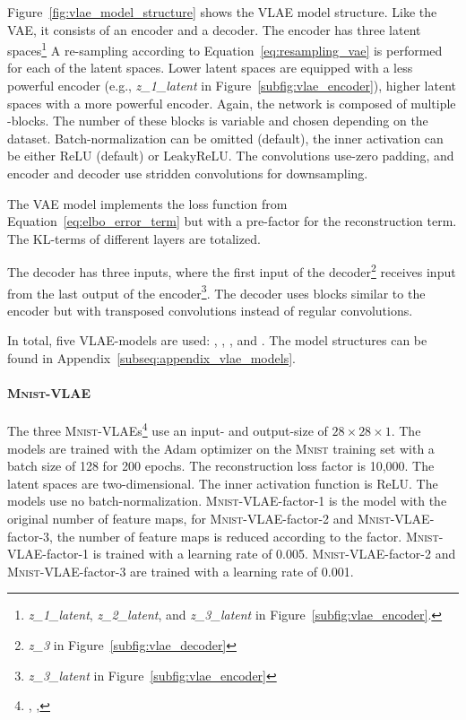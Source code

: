 Figure~\ref{fig:vlae_model_structure} shows the \ac{VLAE} model structure.
Like the \ac{VAE}, it consists of an encoder and a decoder.
The encoder has three latent spaces\footnote{\textit{z\_1\_latent}, \textit{z\_2\_latent}, and \textit{z\_3\_latent} in Figure~\ref{subfig:vlae_encoder}.}
A re-sampling according to Equation~\ref{eq:resampling_vae} is performed for each of the latent spaces.
Lower latent spaces are equipped with a less powerful encoder (e.g., \textit{z\_1\_latent} in Figure~\ref{subfig:vlae_encoder}), higher latent spaces with a more powerful encoder.
Again, the network is composed of multiple -blocks.
The number of these blocks is variable and chosen depending on the dataset.
Batch-normalization can be omitted (default), the inner activation can be either ReLU (default) or LeakyReLU.
The convolutions use-zero padding, and encoder and decoder use stridden convolutions for downsampling.

The \ac{VAE} model implements the loss function from Equation~\ref{eq:elbo_error_term} but with a pre-factor for the reconstruction term.
The \ac{KL}-terms of different layers are totalized.

The decoder has three inputs, where the first input of the decoder\footnote{\textit{z\_3} in Figure~\ref{subfig:vlae_decoder}} receives input from the last output of the encoder\footnote{\textit{z\_3\_latent} in Figure~\ref{subfig:vlae_encoder}}.
The decoder uses blocks similar to the encoder but with transposed convolutions instead of regular convolutions.

In total, five \ac{VLAE}-models are used: , ,  , and .
The model structures can be found in Appendix~\ref{subseq:appendix_vlae_models}.

\paragraph{\textsc{Mnist}-\ac{VLAE}} The three \textsc{Mnist}-\ac{VLAE}s\footnote{, , } use an input- and output-size of $28\times 28\times 1$.
The models are trained with the Adam optimizer on the \textsc{Mnist} training set with a batch size of 128 for 200 epochs.
The reconstruction loss factor is 10,000.
The latent spaces are two-dimensional.
The inner activation function is ReLU.
The models use no batch-normalization.
\textsc{Mnist}-\ac{VLAE}-factor-1 is the model with the original number of feature maps, for \textsc{Mnist}-\ac{VLAE}-factor-2 and \textsc{Mnist}-\ac{VLAE}-factor-3, the number of feature maps is reduced according to the factor.
\textsc{Mnist}-\ac{VLAE}-factor-1 is trained with a learning rate of 0.005.
\textsc{Mnist}-\ac{VLAE}-factor-2 and \textsc{Mnist}-\ac{VLAE}-factor-3 are trained with a learning rate of 0.001.

